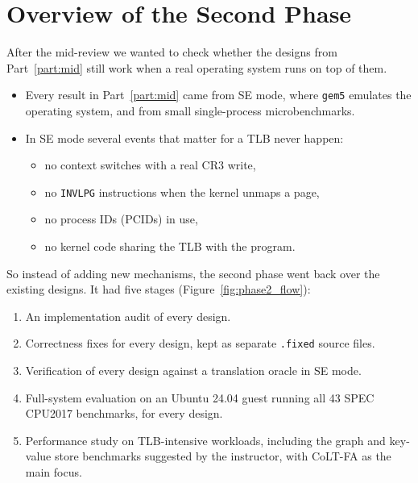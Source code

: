 
\section{Overview of the Second Phase}
\label{sec:phase2}

After the mid-review we wanted to check whether the designs from Part~\ref{part:mid} still work when a real operating system runs on top of them.
\begin{itemize}
    \item Every result in Part~\ref{part:mid} came from SE mode, where \texttt{gem5} emulates the operating system, and from small single-process microbenchmarks.
    \item In SE mode several events that matter for a TLB never happen:
    \begin{itemize}
        \item no context switches with a real CR3 write,
        \item no \texttt{INVLPG} instructions when the kernel unmaps a page,
        \item no process IDs (PCIDs) in use,
        \item no kernel code sharing the TLB with the program.
    \end{itemize}
\end{itemize}

\noindent So instead of adding new mechanisms, the second phase went back over the existing designs. It had five stages (Figure~\ref{fig:phase2_flow}):
\begin{enumerate}
    \item An implementation audit of every design.
    \item Correctness fixes for every design, kept as separate \texttt{.fixed} source files.
    \item Verification of every design against a translation oracle in SE mode.
    \item Full-system evaluation on an Ubuntu 24.04 guest running all 43 SPEC CPU2017 benchmarks, for every design.
    \item Performance study on TLB-intensive workloads, including the graph and key-value store benchmarks suggested by the instructor, with CoLT-FA as the main focus.
\end{enumerate}

